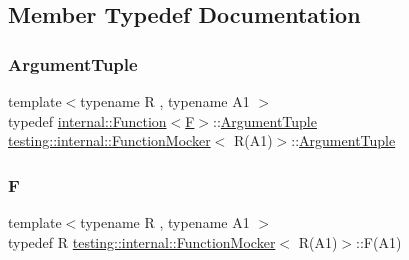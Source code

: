 \subsection{Member Typedef Documentation}
\mbox{\label{classtesting_1_1internal_1_1_function_mocker_3_01_r_07_a1_08_4_aacec6412ac4343c071d7dfe965558b0b}} 
\subsubsection{\texorpdfstring{ArgumentTuple}{ArgumentTuple}}
{\footnotesize\ttfamily template$<$typename R , typename A1 $>$ \\
typedef \mbox{\hyperlink{structtesting_1_1internal_1_1_function}{internal\+::\+Function}}$<$\mbox{\hyperlink{classtesting_1_1internal_1_1_function_mocker_3_01_r_07_a1_08_4_ada54286442ab14a18c2308cef748848f}{F}}$>$\+::\mbox{\hyperlink{classtesting_1_1internal_1_1_function_mocker_3_01_r_07_a1_08_4_aacec6412ac4343c071d7dfe965558b0b}{Argument\+Tuple}} \mbox{\hyperlink{classtesting_1_1internal_1_1_function_mocker}{testing\+::internal\+::\+Function\+Mocker}}$<$ R(A1)$>$\+::\mbox{\hyperlink{classtesting_1_1internal_1_1_function_mocker_3_01_r_07_a1_08_4_aacec6412ac4343c071d7dfe965558b0b}{Argument\+Tuple}}}

\mbox{\label{classtesting_1_1internal_1_1_function_mocker_3_01_r_07_a1_08_4_ada54286442ab14a18c2308cef748848f}} 
\subsubsection{\texorpdfstring{F}{F}}
{\footnotesize\ttfamily template$<$typename R , typename A1 $>$ \\
typedef R \mbox{\hyperlink{classtesting_1_1internal_1_1_function_mocker}{testing\+::internal\+::\+Function\+Mocker}}$<$ R(A1)$>$\+::F(A1)}



